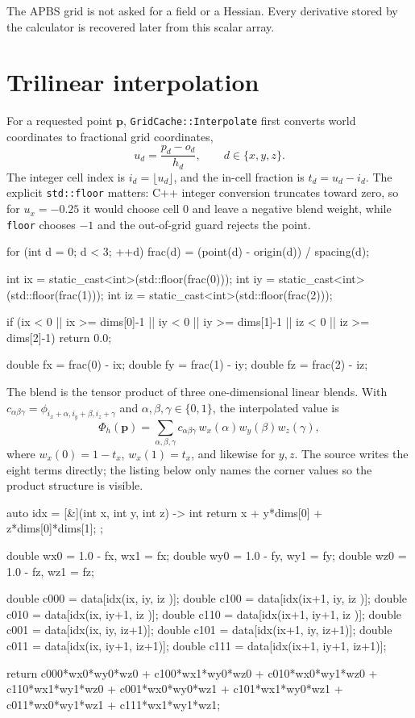 \documentclass[11pt]{article}
\newcommand{\code}[1]{\texttt{#1}}
\begin{document}
The APBS grid is not asked for a field or a Hessian. Every derivative stored by
the calculator is recovered later from this scalar array.

\section{Trilinear interpolation}

For a requested point \(\bm p\), \code{GridCache::Interpolate} first converts
world coordinates to fractional grid coordinates,
\[
  u_d = \frac{p_d-o_d}{h_d},\qquad d\in\{x,y,z\}.
\]
The integer cell index is \(i_d=\lfloor u_d\rfloor\), and the in-cell fraction
is \(t_d=u_d-i_d\). The explicit \code{std::floor} matters: C++ integer
conversion truncates toward zero, so for \(u_x=-0.25\) it would choose cell
\(0\) and leave a negative blend weight, while \code{floor} chooses \(-1\) and
the out-of-grid guard rejects the point.

\begin{codebox}
for (int d = 0; d < 3; ++d)
    frac(d) = (point(d) - origin(d)) / spacing(d);

int ix = static_cast<int>(std::floor(frac(0)));
int iy = static_cast<int>(std::floor(frac(1)));
int iz = static_cast<int>(std::floor(frac(2)));

if (ix < 0 || ix >= dims[0]-1 ||
    iy < 0 || iy >= dims[1]-1 ||
    iz < 0 || iz >= dims[2]-1)
    return 0.0;

double fx = frac(0) - ix;
double fy = frac(1) - iy;
double fz = frac(2) - iz;
\end{codebox}

The blend is the tensor product of three one-dimensional linear blends. With
\(c_{\alpha\beta\gamma}=
\phi_{i_x+\alpha,i_y+\beta,i_z+\gamma}\) and
\(\alpha,\beta,\gamma\in\{0,1\}\), the interpolated value is
\[
  \Phi_h(\bm p)=
  \sum_{\alpha,\beta,\gamma}
  c_{\alpha\beta\gamma}\,
  w_x(\alpha)w_y(\beta)w_z(\gamma),
\]
where \(w_x(0)=1-t_x\), \(w_x(1)=t_x\), and likewise for \(y,z\). The source
writes the eight terms directly; the listing below only names the corner values
so the product structure is visible.

\begin{codebox}
auto idx = [&](int x, int y, int z) -> int {
    return x + y*dims[0] + z*dims[0]*dims[1];
};

double wx0 = 1.0 - fx, wx1 = fx;
double wy0 = 1.0 - fy, wy1 = fy;
double wz0 = 1.0 - fz, wz1 = fz;

double c000 = data[idx(ix,   iy,   iz  )];
double c100 = data[idx(ix+1, iy,   iz  )];
double c010 = data[idx(ix,   iy+1, iz  )];
double c110 = data[idx(ix+1, iy+1, iz  )];
double c001 = data[idx(ix,   iy,   iz+1)];
double c101 = data[idx(ix+1, iy,   iz+1)];
double c011 = data[idx(ix,   iy+1, iz+1)];
double c111 = data[idx(ix+1, iy+1, iz+1)];

return c000*wx0*wy0*wz0 + c100*wx1*wy0*wz0
     + c010*wx0*wy1*wz0 + c110*wx1*wy1*wz0
     + c001*wx0*wy0*wz1 + c101*wx1*wy0*wz1
     + c011*wx0*wy1*wz1 + c111*wx1*wy1*wz1;
\end{codebox}
\end{document}
